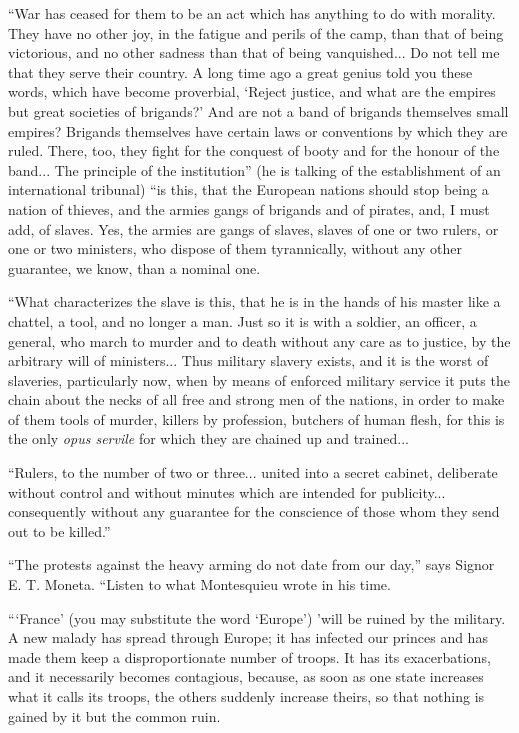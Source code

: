 \documentclass{book}
\begin{document}
“War has ceased for them to be an act which has anything to do with morality. They have no other joy, in the fatigue and perils of the camp, than that of being victorious, and no other sadness than that of being vanquished... Do not tell me that they serve their country. A long time ago a great genius told you these words, which have become proverbial, ‘Reject justice, and what are the empires but great societies of brigands?’ And are not a band of brigands themselves small empires? Brigands themselves have certain laws or conventions by which they are ruled. There, too, they fight for the conquest of booty and for the honour of the band... The principle of the institution” (he is talking of the establishment of an international tribunal) “is this, that the European nations should stop being a nation of thieves, and the armies gangs of brigands and of pirates, and, I must add, of slaves. Yes, the armies are gangs of slaves, slaves of one or two rulers, or one or two ministers, who dispose of them tyrannically, without any other guarantee, we know, than a nominal one.

“What characterizes the slave is this, that he is in the hands of his master like a chattel, a tool, and no longer a man. Just so it is with a soldier, an officer, a general, who march to murder and to death without any care as to justice, by the arbitrary will of ministers... Thus military slavery exists, and it is the worst of slaveries, particularly now, when by means of enforced military service it puts the chain about the necks of all free and strong men of the nations, in order to make of them tools of murder, killers by profession, butchers of human flesh, for this is the only \emph{opus servile} for which they are chained up and trained...

“Rulers, to the number of two or three... united into a secret cabinet, deliberate without control and without minutes which are intended for publicity... consequently without any guarantee for the conscience of those whom they send out to be killed.”

“The protests against the heavy arming do not date from our day,” says Signor E. T. Moneta. “Listen to what Montesquieu wrote in his time.

“‘France’ (you may substitute the word ‘Europe’) ’will be ruined by the military. A new malady has spread through Europe; it has infected our princes and has made them keep a disproportionate number of troops. It has its exacerbations, and it necessarily becomes contagious, because, as soon as one state increases what it calls its troops, the others suddenly increase theirs, so that nothing is gained by it but the common ruin.
\end{document}
